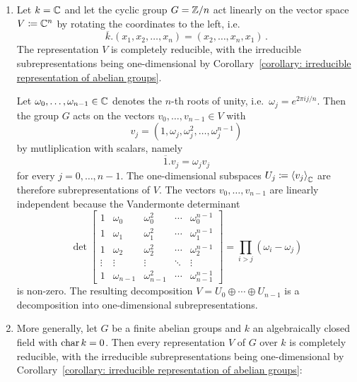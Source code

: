 \begin{example}
  \label{example: complex representations of finite abelian groups are completely reducible}
  \leavevmode
  \begin{enumerate}
    \item
      Let $k = \mathbb{C}$ and let the cyclic group $G = \mathbb{Z}/n$ act linearly on the vector space $V \coloneqq \mathbb{C}^n$ by rotating the coordinates to the left, i.e.
      \[
          \overline{k}.(x_1, x_2, \dotsc, x_n)
        = (x_2, \dotsc, x_n, x_1) \,.
      \]
      The representation $V$ is completely reducible, with the irreducible subrepresentations being one-dimensional by Corollary~\ref{corollary: irreducible representation of abelian groups}.
      
      Let $\omega_0, \dotsc, \omega_{n-1} \in \mathbb{C}$ denotes the $n$-th roots of unity, i.e.\ $\omega_j = e^{2 \pi i j/n}$.
      Then the group $G$ acts on the vectors $v_0, \dotsc, v_{n-1} \in V$ with
      \[
          v_j
        = (1, \omega_j, \omega_j^2, \dotsc, \omega_j^{n-1})
      \]
      by mutliplication with scalars, namely
      \[
          \overline{1}.v_j
        = \omega_j v_j
      \]
      for every $j = 0, \dotsc, n-1$.
      The one-dimensional subspaces $U_j \coloneqq \left\langle  v_j  \right\rangle_{\mathbb{C}}$ are therefore subrepresentations of $V$.
      The vectors $v_0, \dotsc, v_{n-1}$ are linearly independent because the Vandermonte determinant
      \[
          \det
          \begin{bmatrix}
            1       & \omega_0      & \omega_0^2      & \cdots  & \omega_0^{n-1}      \\
            1       & \omega_1      & \omega_1^2      & \cdots  & \omega_1^{n-1}      \\
            1       & \omega_2      & \omega_2^2      & \cdots  & \omega_2^{n-1}      \\
            \vdots  & \vdots        & \vdots          & \ddots  & \vdots              \\
            1       & \omega_{n-1}  & \omega_{n-1}^2  & \cdots  & \omega_{n-1}^{n-1}
          \end{bmatrix}
        = \prod_{i > j} (\omega_i - \omega_j)
      \]
      is non-zero.
      The resulting decomposition $V = U_0 \oplus \dotsb \oplus U_{n-1}$ is a decomposition into one-dimensional subrepresentations.
    \item
      More generally, let $G$ be a finite abelian groups and $k$ an algebraically closed field with $\operatorname{char} k = 0$.
      Then every representation $V$ of $G$ over $k$ is completely reducible, with the irreducible subrepresentations being one-dimensional by Corollary~\ref{corollary: irreducible representation of abelian groups}:
    

\end{enumerate}
\end{example}
